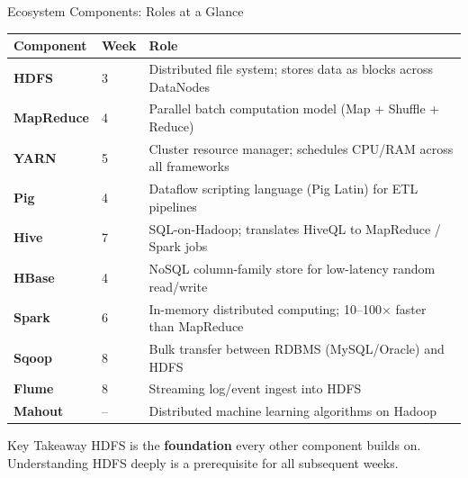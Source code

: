 \documentclass[aspectratio=169,10pt]{beamer}
\begin{document}
\begin{frame}{Ecosystem Components: Roles at a Glance}
  \centering
  \renewcommand{\arraystretch}{1.38}
  \begin{tabular}{p{1.8cm}p{1.5cm}p{9.5cm}}
    \toprule
    \textbf{Component} & \textbf{Week} & \textbf{Role} \\
    \midrule
    \textbf{HDFS}      & 3 & Distributed file system; stores data as blocks across DataNodes \\
    \textbf{MapReduce} & 4 & Parallel batch computation model (Map + Shuffle + Reduce) \\
    \textbf{YARN}      & 5 & Cluster resource manager; schedules CPU/RAM across all frameworks \\
    \textbf{Pig}       & 4 & Dataflow scripting language (Pig Latin) for ETL pipelines \\
    \textbf{Hive}      & 7 & SQL-on-Hadoop; translates HiveQL to MapReduce / Spark jobs \\
    \textbf{HBase}     & 4 & NoSQL column-family store for low-latency random read/write \\
    \textbf{Spark}     & 6 & In-memory distributed computing; 10--100$\times$ faster than MapReduce \\
    \textbf{Sqoop}     & 8 & Bulk transfer between RDBMS (MySQL/Oracle) and HDFS \\
    \textbf{Flume}     & 8 & Streaming log/event ingest into HDFS \\
    \textbf{Mahout}    & -- & Distributed machine learning algorithms on Hadoop \\
    \bottomrule
  \end{tabular}
  \vspace{6pt}
  \begin{block}{Key Takeaway}
    HDFS is the \textbf{foundation} every other component builds on.  Understanding HDFS deeply is a prerequisite for all subsequent weeks.
  \end{block}
\end{frame}
\end{document}
